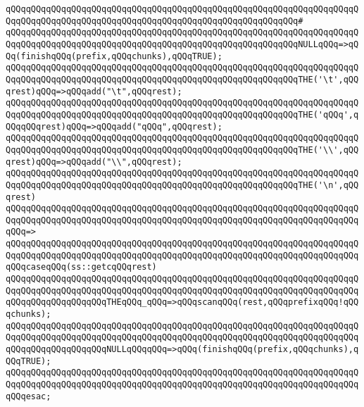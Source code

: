 \verb|qQQqqQQqqQQqqQQqqQQqqQQqqQQqqQQqqQQqqQQqqQQqqQQqqQQqqQQqqQQqqQQqqQQqqQQqqQQqqQQqqQQqqQQqqQQqqQQqqQQqqQQqqQQqqQQqqQQqqQQqqQQqqQQq#|\newline
\verb|qQQqqQQqqQQqqQQqqQQqqQQqqQQqqQQqqQQqqQQqqQQqqQQqqQQqqQQqqQQqqQQqqQQqqQQqqQQqqQQqqQQqqQQqqQQqqQQqqQQqqQQqqQQqqQQqqQQqqQQqqQQqqQQqNULLqQQq=>qQQq(finishqQQq(prefix,qQQqchunks),qQQqTRUE);|\newline
\verb|qQQqqQQqqQQqqQQqqQQqqQQqqQQqqQQqqQQqqQQqqQQqqQQqqQQqqQQqqQQqqQQqqQQqqQQqqQQqqQQqqQQqqQQqqQQqqQQqqQQqqQQqqQQqqQQqqQQqqQQqqQQqqQQqTHE('\t',qQQqrest)qQQq=>qQQqadd("\t",qQQqrest);|\newline
\verb|qQQqqQQqqQQqqQQqqQQqqQQqqQQqqQQqqQQqqQQqqQQqqQQqqQQqqQQqqQQqqQQqqQQqqQQqqQQqqQQqqQQqqQQqqQQqqQQqqQQqqQQqqQQqqQQqqQQqqQQqqQQqqQQqTHE('qQQq',qQQqqQQqrest)qQQq=>qQQqadd("qQQq",qQQqrest);|\newline
\verb|qQQqqQQqqQQqqQQqqQQqqQQqqQQqqQQqqQQqqQQqqQQqqQQqqQQqqQQqqQQqqQQqqQQqqQQqqQQqqQQqqQQqqQQqqQQqqQQqqQQqqQQqqQQqqQQqqQQqqQQqqQQqqQQqTHE('\\',qQQqrest)qQQq=>qQQqadd("\\",qQQqrest);|\newline
\newline
\verb|qQQqqQQqqQQqqQQqqQQqqQQqqQQqqQQqqQQqqQQqqQQqqQQqqQQqqQQqqQQqqQQqqQQqqQQqqQQqqQQqqQQqqQQqqQQqqQQqqQQqqQQqqQQqqQQqqQQqqQQqqQQqqQQqTHE('\n',qQQqrest)|\newline
\verb|qQQqqQQqqQQqqQQqqQQqqQQqqQQqqQQqqQQqqQQqqQQqqQQqqQQqqQQqqQQqqQQqqQQqqQQqqQQqqQQqqQQqqQQqqQQqqQQqqQQqqQQqqQQqqQQqqQQqqQQqqQQqqQQqqQQqqQQqqQQqqQQq=>|\newline
\verb|qQQqqQQqqQQqqQQqqQQqqQQqqQQqqQQqqQQqqQQqqQQqqQQqqQQqqQQqqQQqqQQqqQQqqQQqqQQqqQQqqQQqqQQqqQQqqQQqqQQqqQQqqQQqqQQqqQQqqQQqqQQqqQQqqQQqqQQqqQQqqQQqcaseqQQq(ss::getcqQQqrest)|\newline
\verb|qQQqqQQqqQQqqQQqqQQqqQQqqQQqqQQqqQQqqQQqqQQqqQQqqQQqqQQqqQQqqQQqqQQqqQQqqQQqqQQqqQQqqQQqqQQqqQQqqQQqqQQqqQQqqQQqqQQqqQQqqQQqqQQqqQQqqQQqqQQqqQQqqQQqqQQqqQQqqQQqTHEqQQq_qQQq=>qQQqscanqQQq(rest,qQQqprefixqQQq!qQQqchunks);|\newline
\verb|qQQqqQQqqQQqqQQqqQQqqQQqqQQqqQQqqQQqqQQqqQQqqQQqqQQqqQQqqQQqqQQqqQQqqQQqqQQqqQQqqQQqqQQqqQQqqQQqqQQqqQQqqQQqqQQqqQQqqQQqqQQqqQQqqQQqqQQqqQQqqQQqqQQqqQQqqQQqqQQqNULLqQQqqQQq=>qQQq(finishqQQq(prefix,qQQqchunks),qQQqTRUE);|\newline
\verb|qQQqqQQqqQQqqQQqqQQqqQQqqQQqqQQqqQQqqQQqqQQqqQQqqQQqqQQqqQQqqQQqqQQqqQQqqQQqqQQqqQQqqQQqqQQqqQQqqQQqqQQqqQQqqQQqqQQqqQQqqQQqqQQqqQQqqQQqqQQqqQQqesac;|\newline
